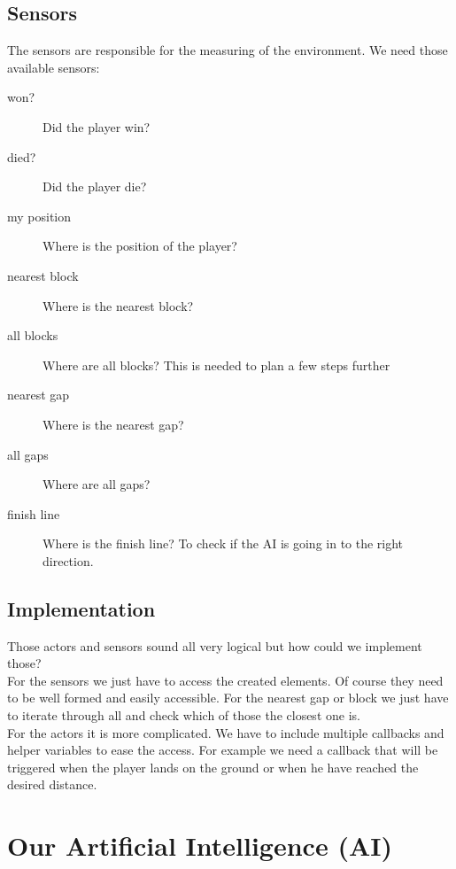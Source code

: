 \subsection{Sensors}
The sensors are responsible for the measuring of the environment. We need those available sensors:
\begin{description}
  \item[won?] Did the player win?
  \item[died?] Did the player die?
  \item[my position] Where is the position of the player?
  \item[nearest block] Where is the nearest block?
  \item[all blocks] Where are all blocks? This is needed to plan a few steps further
  \item[nearest gap] Where is the nearest gap?
  \item[all gaps] Where are all gaps?
  \item[finish line] Where is the finish line? To check if the AI is going in to the right direction.
\end{description}
\subsection{Implementation}
Those actors and sensors sound all very logical but how could we implement those?\medskip\\
For the sensors we just have to access the created elements. Of course they need to be well formed and easily accessible. For the nearest gap or block we just have to iterate through all and check which of those the closest one is.\medskip\\
For the actors it is more complicated. We have to include multiple callbacks and helper variables to ease the access. For example we need a callback that will be triggered when the player lands on the ground or when he have reached the desired distance.
\newpage
\section{Our Artificial Intelligence (AI)}
